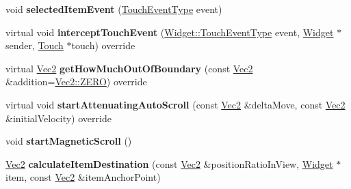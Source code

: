 \begin{DoxyCompactItemize}
\item 
\mbox{\label{classui_1_1ListView_a44bec6d5b26502059a40f056a8ae16e1}} 
void {\bfseries selected\+Item\+Event} (\hyperlink{classui_1_1Widget_a4829c0f1cbaf1fd820a9b2ccf0c58c73}{Touch\+Event\+Type} event)
\item 
\mbox{\label{classui_1_1ListView_a43249fd66ec2fd5a98e7be0ad0da187b}} 
virtual void {\bfseries intercept\+Touch\+Event} (\hyperlink{classui_1_1Widget_a4829c0f1cbaf1fd820a9b2ccf0c58c73}{Widget\+::\+Touch\+Event\+Type} event, \hyperlink{classui_1_1Widget}{Widget} $\ast$sender, \hyperlink{classTouch}{Touch} $\ast$touch) override
\item 
\mbox{\label{classui_1_1ListView_a3ca5321e50adadba006907b7c23e9545}} 
virtual \hyperlink{classVec2}{Vec2} {\bfseries get\+How\+Much\+Out\+Of\+Boundary} (const \hyperlink{classVec2}{Vec2} \&addition=\hyperlink{classVec2_a5c80e2e7c8bd2adcbad2844d060e6245}{Vec2\+::\+Z\+E\+RO}) override
\item 
\mbox{\label{classui_1_1ListView_a5db37e4b914390c9c67801094d9b9614}} 
virtual void {\bfseries start\+Attenuating\+Auto\+Scroll} (const \hyperlink{classVec2}{Vec2} \&delta\+Move, const \hyperlink{classVec2}{Vec2} \&initial\+Velocity) override
\item 
\mbox{\label{classui_1_1ListView_a9331e4ab296569082819c855edcd0a91}} 
void {\bfseries start\+Magnetic\+Scroll} ()
\item 
\mbox{\label{classui_1_1ListView_a4ac5978c0152bbca5b822c2418068a51}} 
\hyperlink{classVec2}{Vec2} {\bfseries calculate\+Item\+Destination} (const \hyperlink{classVec2}{Vec2} \&position\+Ratio\+In\+View, \hyperlink{classui_1_1Widget}{Widget} $\ast$item, const \hyperlink{classVec2}{Vec2} \&item\+Anchor\+Point)
\end{DoxyCompactItemize}
